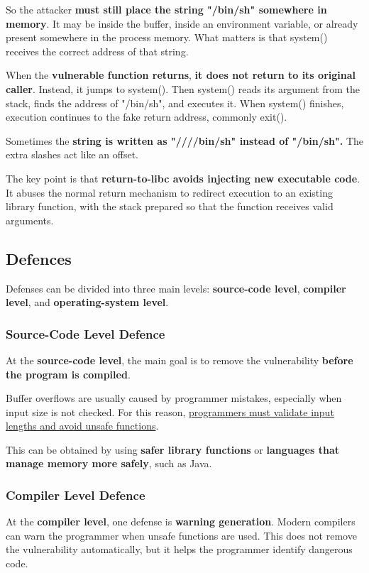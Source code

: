 \documentclass{article}
\begin{document}
So the attacker \textbf{must still place the string "/bin/sh" somewhere in memory}. It may be inside the buffer, inside an environment variable, or already present somewhere in the process memory. What matters is that system() receives the correct address of that string.

When the \textbf{vulnerable function returns}, \textbf{it does not return to its original caller}. Instead, it jumps to system(). Then system() reads its argument from the stack, finds the address of "/bin/sh", and executes it. When system() finishes, execution continues to the fake return address, commonly exit().

Sometimes the \textbf{string is written as "////bin/sh" instead of "/bin/sh".} The extra slashes act like an offset.

The key point is that \textbf{return-to-libc avoids injecting new executable code}. It abuses the normal return mechanism to redirect execution to an existing library function, with the stack prepared so that the function receives valid arguments.

\subsection{Defences}

Defenses can be divided into three main levels: \textbf{source-code level}, \textbf{compiler level}, and \textbf{operating-system level}.

\subsubsection{Source-Code Level Defence}

At the \textbf{source-code level}, the main goal is to remove the vulnerability \textbf{before the program is compiled}.

Buffer overflows are usually caused by programmer mistakes, especially when input size is not checked. For this reason, \underline{programmers must validate input lengths and avoid unsafe functions}.

This can be obtained by using \textbf{safer library functions} or \textbf{languages that manage memory more safely}, such as Java.

\subsubsection{Compiler Level Defence}

At the \textbf{compiler level}, one defense is \textbf{warning generation}. Modern compilers can warn the programmer when unsafe functions are used. This does not remove the vulnerability automatically, but it helps the programmer identify dangerous code.
\end{document}
